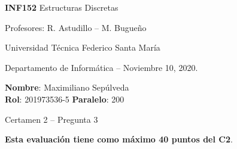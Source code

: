 \documentclass[legalpaper,10pt]{article}
\begin{document}
\thispagestyle{empty}

\begin{minipage}[t]{0.6\textwidth}

{\LARGE \textbf{INF152} Estructuras Discretas}

{\large Profesores: R. Astudillo -- M. Bugueño}

Universidad Técnica Federico Santa María

Departamento de Informática -- Noviembre 10, 2020.

\end{minipage}
\hfill
\begin{minipage}[t]{0.35\textwidth}
\textbf{Nombre}: Maximiliano Sepúlveda\\[0.3cm]
\textbf{Rol}: 201973536-5 \textbf{Paralelo}: 200
\end{minipage}

\vspace{0.8cm}

{\Large Certamen 2 -- Pregunta 3}

\vspace{0.4cm}

\textbf{Esta evaluación tiene como máximo 40 puntos del C2}.
\end{document}
